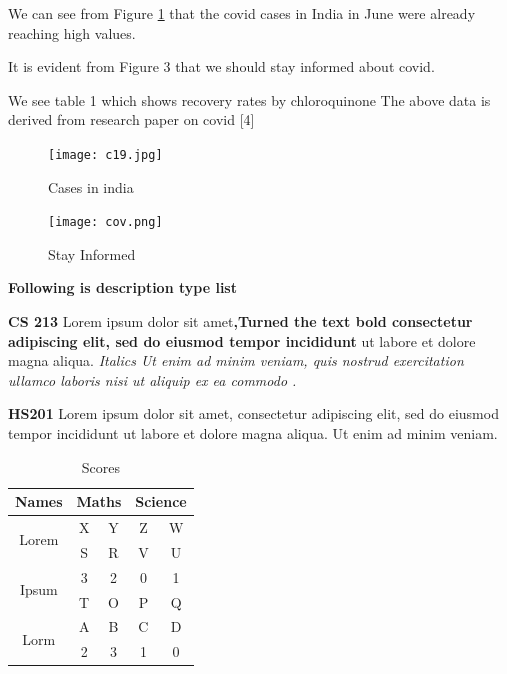 \documentclass[10pt]{article}
\begin{document}
We can see from Figure \ref{fig:label1} that the covid cases in India in June were already reaching high values.
\medskip

It is evident from Figure 3 that we should stay informed about covid.
\medskip

We see table 1 which shows recovery rates by chloroquinone
\newline The above data is derived from research paper on covid [4]

\newpage


\begin{figure}[hbt!]
\begin{center}
\label{fig:label1}
\texttt{[image: c19.jpg]}
\caption{Cases in india}
\end{center}
\end{figure}

\begin{figure}[hbt!]
\begin{center}
\texttt{[image: cov.png]}
\caption{Stay Informed}
\end{center}
\end{figure}

\textbf{Following is description type list}\\
\begin{description}
\item \textbf{CS 213} Lorem ipsum dolor sit amet\textbf{,Turned the text bold consectetur adipiscing elit, sed do eiusmod tempor incididunt} ut labore et
dolore magna aliqua.  \textit{Italics Ut enim ad minim veniam, quis nostrud
exercitation ullamco laboris nisi ut aliquip ex ea commodo .} \\


\bigskip 

\item \textbf{HS201}  Lorem ipsum dolor sit amet, consectetur adipiscing elit, sed do eiusmod tempor incididunt ut labore et dolore magna aliqua. Ut enim ad
minim veniam.

\end{description}

\newpage
\pagecolor{green}

\begin{center}
\begin{table}[t]
\centering
\begin{tabular}{|c|c|c|c|c|}
\hline
Names & \multicolumn{2}{|c|}{Maths} & \multicolumn{2}{|c|}{Science}  \\
\hline
\multirow{2}{4em}{Lorem} & X & Y & Z & W \\
\cline{2-5}
& S & R & V & U \\
\hline
\multirow{2}{4em}{Ipsum} & 3 & 2 & 0 & 1 \\
\cline{2-5}
& T & O & P & Q \\
\hline
\multirow{2}{4em}{Lorm} & A & B & C & D \\
\cline{2-5}
& 2 & 3 & 1 & 0 \\
\hline

\end{tabular}
\caption{\label{tab:table-name}Scores}
\end{table}
\end{center}
\end{document}
